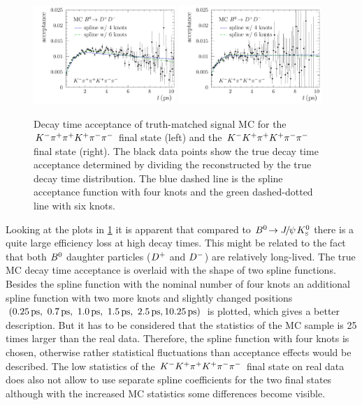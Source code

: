 \begin{figure}[htb]
\centering
\includegraphics[width=0.48\textwidth]{07-B02DD/tikz/pdf/Acceptancespline_nolog_MC_Kpipi.pdf}
\includegraphics[width=0.48\textwidth]{07-B02DD/tikz/pdf/Acceptancespline_nolog_MC_KKpi.pdf}
\caption{Decay time acceptance of truth-matched signal MC for the ${{K}^-}{{\pi}^+}{{\pi}^+}{{K}^+}{{\pi}^-}{{\pi}^-}$
final state (left) and the ${{K}^-}{{K}^+}{{\pi}^+}{{K}^+}{{\pi}^-}{{\pi}^-}$ final state (right). The black data
points show the true decay time acceptance determined by dividing the
reconstructed by the true decay time distribution. The blue dashed line is the
spline acceptance function with four knots and the green dashed-dotted line
with six knots.}
\label{fig:b02dd:decaytimefit:acceptance_MC}
\end{figure}

Looking at the plots in \cref{fig:b02dd:decaytimefit:acceptance_MC} it is
apparent that compared to ${{B}^0}\!\rightarrow {\ensuremath{{J\mskip -3mu/\mskip -2mu\psi\mskip 2mu}}}{\ensuremath{{K}^0_{\mathrm{ \scriptscriptstyle S}}}}$ there is a quite large efficiency loss
at high decay times. This might be related to the fact that both ${{B}^0}$
daughter particles (${{D}^+}$ and ${{D}^-}$) are relatively long-lived. The true MC
decay time acceptance is overlaid with the shape of two spline functions.
Besides the spline function with the nominal number of four knots an
additional spline function with two more knots and slightly changed positions
$(\SIlist[list-final-separator={, }]{0.25;0.7;1.0;1.5;2.5;10.25}{\ps})$ is
plotted, which gives a better description. But it has to be considered that
the statistics of the MC sample is \num{25} times larger than the real data.
Therefore, the spline function with four knots is chosen, otherwise rather
statistical fluctuations than acceptance effects would be described. The low
statistics of the ${{K}^-}{{K}^+}{{\pi}^+}{{K}^+}{{\pi}^-}{{\pi}^-}$ final state on real data does also not allow to
use separate spline coefficients for the two final states although with the
increased MC statistics some differences become visible.
